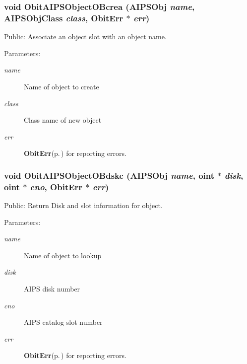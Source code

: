 \subsubsection{\setlength{\rightskip}{0pt plus 5cm}void Obit\-AIPSObject\-OBcrea ({\bf AIPSObj} {\em name}, {\bf AIPSObj\-Class} {\em class}, {\bf Obit\-Err} $\ast$ {\em err})}\label{ObitAIPSObject_8h_a14}


Public: Associate an object slot with an object name. 

\begin{Desc}
\item[Parameters:]
\begin{description}
\item[{\em name}]Name of object to create \item[{\em class}]Class name of new object \item[{\em err}]{\bf Obit\-Err}{\rm (p.\,\pageref{structObitErr})} for reporting errors. \end{description}
\end{Desc}
\subsubsection{\setlength{\rightskip}{0pt plus 5cm}void Obit\-AIPSObject\-OBdskc ({\bf AIPSObj} {\em name}, {\bf oint} $\ast$ {\em disk}, {\bf oint} $\ast$ {\em cno}, {\bf Obit\-Err} $\ast$ {\em err})}\label{ObitAIPSObject_8h_a21}


Public: Return Disk and slot information for object. 

\begin{Desc}
\item[Parameters:]
\begin{description}
\item[{\em name}]Name of object to lookup \item[{\em disk}]AIPS disk number \item[{\em cno}]AIPS catalog slot number \item[{\em err}]{\bf Obit\-Err}{\rm (p.\,\pageref{structObitErr})} for reporting errors. \end{description}
\end{Desc}
